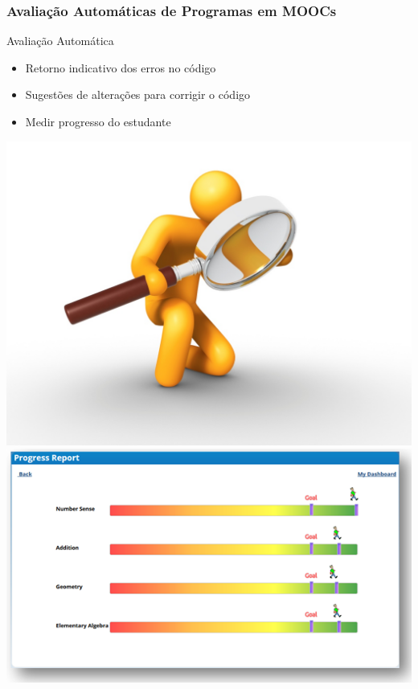 \documentclass{beamer}
\begin{document}
\begin{frame}
 \frametitle{Avaliação Automáticas de Programas em MOOCs}

    \begin{block}{Avaliação Automática}
      \begin{itemize}
        \item Retorno indicativo dos erros no código
        \item Sugestões de alterações para corrigir o código
        \item Medir progresso do estudante
      \end{itemize}
    \end{block}

    \begin{center}
      \includegraphics[scale=0.3]{img/duvida.jpg}
      \hspace{1cm}
      \includegraphics[scale=0.3]{img/progresso.png}
    \end{center}
\end{frame}
\end{document}
